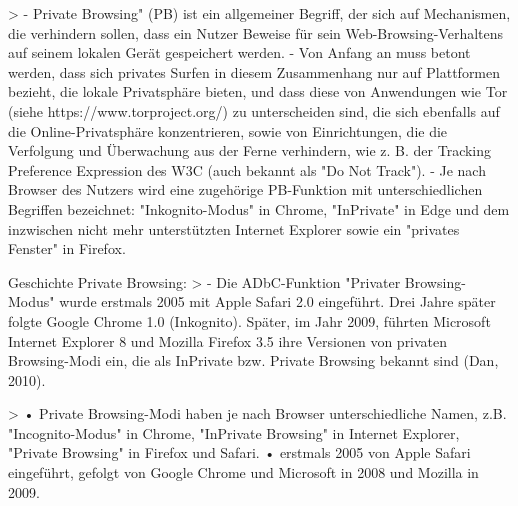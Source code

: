 	> \cite{Horsman.2019}
		-	Private Browsing" (PB) ist ein allgemeiner Begriff, der sich auf Mechanismen, die verhindern sollen, dass ein Nutzer Beweise für sein Web-Browsing-Verhaltens auf seinem lokalen Gerät gespeichert werden.
		-	Von Anfang an muss betont werden, dass sich privates Surfen in diesem Zusammenhang nur auf Plattformen bezieht, die lokale Privatsphäre bieten, und dass diese von Anwendungen wie Tor (siehe https://www.torproject.org/) zu unterscheiden sind, die sich ebenfalls auf die Online-Privatsphäre konzentrieren, sowie von Einrichtungen, die die Verfolgung und Überwachung aus der Ferne verhindern, wie z. B. der Tracking Preference Expression des W3C (auch bekannt als "Do Not Track").
		-	Je nach Browser des Nutzers wird eine zugehörige PB-Funktion mit unterschiedlichen Begriffen bezeichnet: "Inkognito-Modus" in Chrome, "InPrivate" in Edge und dem inzwischen nicht mehr unterstützten Internet Explorer sowie ein "privates Fenster" in Firefox. 




Geschichte Private Browsing:
	> \cite {Said.2011}
		- Die ADbC-Funktion "Privater Browsing-Modus" wurde erstmals 2005 mit Apple Safari 2.0 eingeführt. Drei Jahre später folgte Google Chrome 1.0 (Inkognito). Später, im Jahr 2009, führten Microsoft Internet Explorer 8 und Mozilla Firefox 3.5 ihre Versionen von privaten Browsing-Modi ein, die als InPrivate bzw. Private Browsing bekannt sind (Dan, 2010).
	
	> \cite{Montasari.2015}
		•	Private Browsing-Modi haben je nach Browser unterschiedliche Namen, z.B. "Incognito-Modus" in Chrome, "InPrivate Browsing" in Internet Explorer, "Private Browsing" in Firefox und Safari.
		•	erstmals 2005 von Apple Safari eingeführt, gefolgt von Google Chrome und Microsoft in 2008 und Mozilla in 2009.
	
